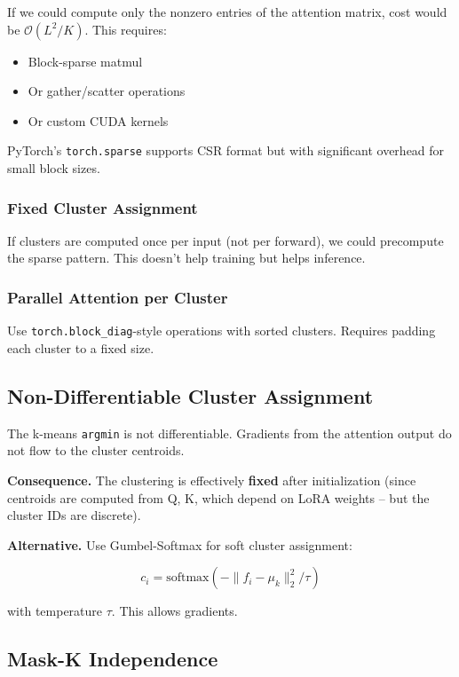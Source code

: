 If we could compute only the nonzero entries of the attention matrix, cost 
would be $\mathcal{O}(L^2/K)$. This requires:

\begin{itemize}
\item Block-sparse matmul
\item Or gather/scatter operations
\item Or custom CUDA kernels

\end{itemize}
PyTorch's \texttt{torch.sparse} supports CSR format but with significant overhead 
for small block sizes.

\subsubsection{Fixed Cluster Assignment}

If clusters are computed once per input (not per forward), we could 
precompute the sparse pattern. This doesn't help training but helps inference.

\subsubsection{Parallel Attention per Cluster}

Use \texttt{torch.block\_diag}-style operations with sorted clusters. Requires 
padding each cluster to a fixed size.

\subsection{Non-Differentiable Cluster Assignment}

The k-means \texttt{argmin} is not differentiable. Gradients from the attention 
output do not flow to the cluster centroids.

\textbf{Consequence.} The clustering is effectively \textbf{fixed} after initialization 
(since centroids are computed from Q, K, which depend on LoRA weights -- 
but the cluster IDs are discrete).

\textbf{Alternative.} Use Gumbel-Softmax for soft cluster assignment:

\[
c_i = \text{softmax}(-\|f_i - \mu_k\|_2^2 / \tau)
\tag{8.1}
\]

with temperature $\tau$. This allows gradients.

\subsection{Mask-K Independence}

